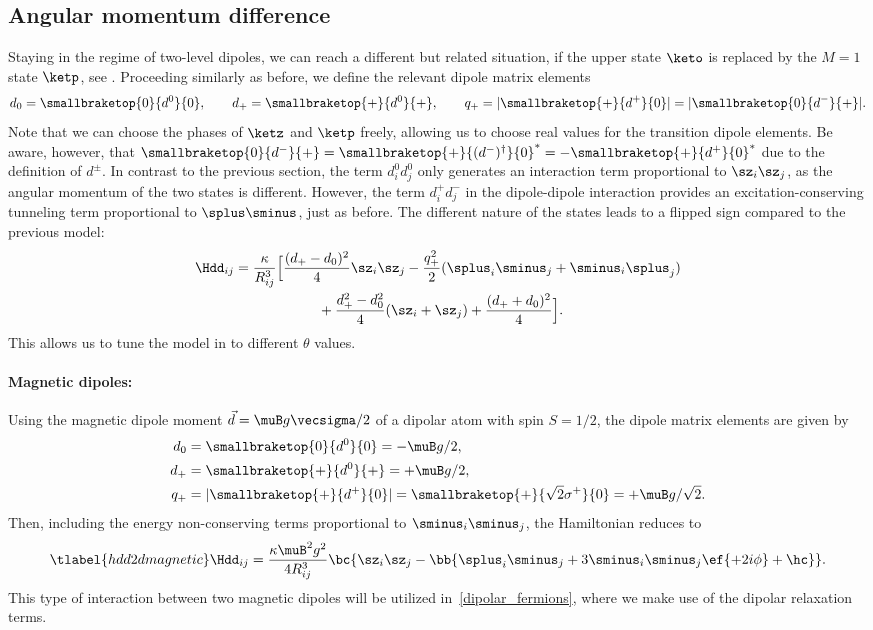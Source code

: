 \subsection{Angular momentum difference}
Staying in the regime of two-level dipoles, we can reach a different but related situation, if the upper state $\keto$ is replaced by the $M=1$ state $\ketp$, see .
Proceeding similarly as before, we define the relevant dipole matrix elements
\begin{align}
    d_0 = \smallbraketop{0}{d^0}{0},\qquad
    d_+ = \smallbraketop{+}{d^0}{+},\qquad
    q_+ = |\smallbraketop{+}{d^+}{0}| = |\smallbraketop{0}{d^-}{+}|.
\end{align}
Note that we can choose the phases of $\ketz$ and $\ketp$ freely, allowing us to choose real values for the transition dipole elements. Be aware, however, that $\smallbraketop{0}{d^-}{+} = \smallbraketop{+}{(d^-)^\dag}{0}^* = -\smallbraketop{+}{d^+}{0}^*$ due to the definition of $d^\pm$.
In contrast to the previous section, the term $d^0_i d^0_j$ only generates an interaction term proportional to $\sz_i \sz_j$, as the angular momentum of the two states is different. However, the term $d^+_i d^-_j$ in the dipole-dipole interaction provides an excitation-conserving tunneling term proportional to $\splus\sminus$, just as before. The different nature of the states leads to a flipped sign compared to the previous model:
\begin{align}
    \Hdd_{ij} &= \frac{\kappa}{R_{ij}^3} \Big[ \frac{(d_+-d_0)^2}{4} \sz_i \sz_j  - \frac{q_+^2}{2} (\splus_i \sminus_j + \sminus_i \splus_j) \\
              &\qquad\qquad\qquad + \frac{d_+^2 - d_0^2}{4} (\sz_i + \sz_j)  + \frac{(d_++d_0)^2}{4} \Big].
\end{align}
This allows us to tune the model in  to different $\theta$ values.

\paragraph{Magnetic dipoles:}
Using the magnetic dipole moment $\vec{d}=\muB g \vecsigma / 2$ of a dipolar atom with spin $S=1/2$,
the dipole matrix elements are given by
\begin{align}
    d_0 &= \smallbraketop{0}{d^0}{0} = -\muB g/2, \vphantom{\sqrt{2}} \\
    d_+ &= \smallbraketop{+}{d^0}{+} = +\muB g/2, \vphantom{\sqrt{2}} \\
    q_+ &= |\smallbraketop{+}{d^+}{0}| = \smallbraketop{+}{\sqrt{2} \sigma^+}{0} = +\muB g/\sqrt{2}.
\end{align}
Then, including the energy non-conserving terms proportional to $\sminus_i\sminus_j$, the Hamiltonian reduces to
\begin{align} \tlabel{hdd2dmagnetic}
    \Hdd_{ij} = \frac{\kappa \muB^2 g^2}{4 R_{ij}^3} \bc{ \sz_i \sz_j - \bb{\splus_i \sminus_j+ 3 \sminus_i\sminus_j \ef{+2i\phi} + \hc } }.
\end{align}
This type of interaction between two magnetic dipoles will be utilized in~\cref{dipolar_fermions}, where we make use of the dipolar relaxation terms.


